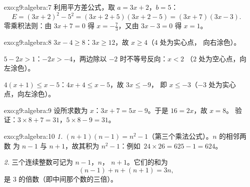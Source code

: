 \begin{solution}{exo:g9:algebra:7}
利用平方差公式，取 $a = 3x + 2$，$b = 5$：
\[
E = (3x + 2)^2 - 5^2 = (3x + 2 + 5)(3x + 2 - 5) = (3x + 7)(3x - 3).
\]
零乘积法则：由 $3x + 7 = 0$ 得 $x = -\frac73$，又由 $3x - 3 = 0$
得 $x = 1$。
\end{solution}

\begin{solution}{exo:g9:algebra:8}
$3x - 4 \geq 8$：$3x \geq 12$，故 $x \geq 4$（$4$ 处为实心点，
向右涂色）。

$5 - 2x > 1$：$-2x > -4$，两边除以 $-2$ 时不等号反向：$x < 2$
（$2$ 处为空心点，向左涂色）。

$4(x+1) \leq x - 5$：$4x + 4 \leq x - 5$，故 $3x \leq -9$，
即 $x \leq -3$（$-3$ 处为实心点，向左涂色）。
\end{solution}

\begin{solution}{exo:g9:algebra:9}
设所求数为 $x$：$3x + 7 = 5x - 9$。于是 $16 = 2x$，故 $x = 8$。
验证：$3 \times 8 + 7 = 31$，$5 \times 8 - 9 = 31$。
\end{solution}

\begin{solution}{exo:g9:algebra:10}
\emph{1.} $(n+1)(n-1) = n^2 - 1$（第三个乘法公式）。$n$ 的相邻两数
为 $n - 1$ 与 $n + 1$，故其积为 $n^2 - 1$：例如\
$24 \times 26 = 625 - 1 = 624$。

\emph{2.} 三个连续整数可记为 $n - 1$，$n$，
$n + 1$。它们的和为
\[
(n-1) + n + (n+1) = 3n ,
\]
是 $3$ 的倍数（即中间那个数的三倍）。
\end{solution}

